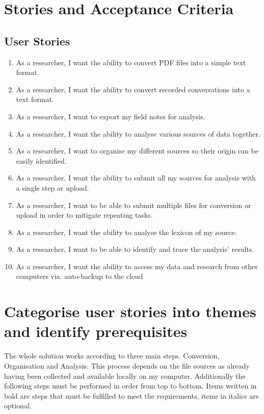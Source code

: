 \documentclass{article}
\begin{document}
\section{Stories and Acceptance Criteria}
\subsection{User Stories}
\begin{enumerate}
    \item As a researcher, I want the ability to convert PDF files into a simple text format.
    
    \item As a researcher, I want the ability to convert recorded conversations into a text format.
    
    \item As a researcher, I want to export my field notes for analysis.
    
    \item As a researcher, I want the ability to analyse various sources of data together.
    
    \item As a researcher, I want to organise my different sources so their origin can be easily identified.
    
    \item As a researcher, I want the ability to submit all my sources for analysis with a single step or upload.
    
    \item As a researcher, I want to be able to submit multiple files for conversion or upload in order to mitigate repeating tasks.
    
    \item As a researcher, I want the ability to analyse the lexicon of my source.
    
    \item As a researcher, I want to be able to identify and trace the analysis' results.
    
    \item As a researcher, I want the ability to access my data and research from other computers via. auto-backup to the cloud
    
\end{enumerate}

\section{Categorise user stories into themes and identify prerequisites}
The whole solution works according to three main steps. Conversion, Organisation and Analysis. This process depends on the file sources as already having been collected and available locally on my computer. Additionally the following steps must be performed in order from top to bottom. Items written in bold are steps that must be fulfilled to meet the requirements, items in italics are optional.
\end{document}
